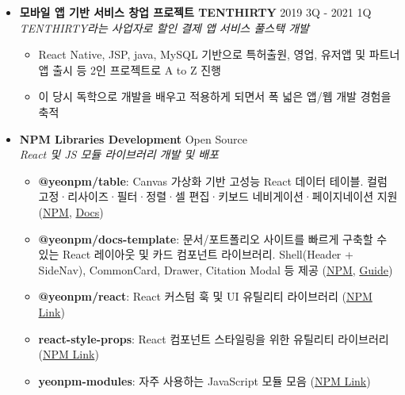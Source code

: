 \documentclass[a4paper, 11pt]{article}
\begin{document}
{\begin{itemize}[leftmargin=*, itemsep=5pt]
        \item \textbf{모바일 앱 기반 서비스 창업 프로젝트 TENTHIRTY} \hfill 2019 3Q - 2021 1Q \\
        \textit{TENTHIRTY라는 사업자로 할인 결제 앱 서비스 풀스택 개발}
        \begin{itemize}[label={-}, noitemsep, topsep=2pt]
            \item React Native, JSP, java, MySQL 기반으로 특허출원, 영업, 유저앱 및 파트너앱 출시 등 2인 프로젝트로 A to Z 진행
            \item 이 당시 독학으로 개발을 배우고 적용하게 되면서 폭 넓은 앱/웹 개발 경험을 축적
        \end{itemize}

        \item \textbf{NPM Libraries Development} \hfill Open Source \\
        \textit{React 및 JS 모듈 라이브러리 개발 및 배포}
        \begin{itemize}[label={-}, noitemsep]
            \item \textbf{@yeonpm/table}: Canvas 가상화 기반 고성능 React 데이터 테이블. 컬럼 고정·리사이즈·필터·정렬·셀 편집·키보드 네비게이션·페이지네이션 지원 (\href{https://www.npmjs.com/package/@yeonpm/table}{NPM}, \href{https://yeonpm-table.vercel.app}{Docs})
            \item \textbf{@yeonpm/docs-template}: 문서/포트폴리오 사이트를 빠르게 구축할 수 있는 React 레이아웃 및 카드 컴포넌트 라이브러리. Shell(Header + SideNav), CommonCard, Drawer, Citation Modal 등 제공 (\href{https://www.npmjs.com/package/@yeonpm/docs-template}{NPM}, \href{https://yeonpm-docs-template.vercel.app}{Guide})
            \item \textbf{@yeonpm/react}: React 커스텀 훅 및 UI 유틸리티 라이브러리 (\href{https://www.npmjs.com/package/@yeonpm/react}{NPM Link})
            \item \textbf{react-style-props}: React 컴포넌트 스타일링을 위한 유틸리티 라이브러리 (\href{https://www.npmjs.com/package/react-style-props}{NPM Link})
            \item \textbf{yeonpm-modules}: 자주 사용하는 JavaScript 모듈 모음 (\href{https://www.npmjs.com/package/yeonpm-modules}{NPM Link})
        \end{itemize}

    \end{itemize}
}
\end{document}
